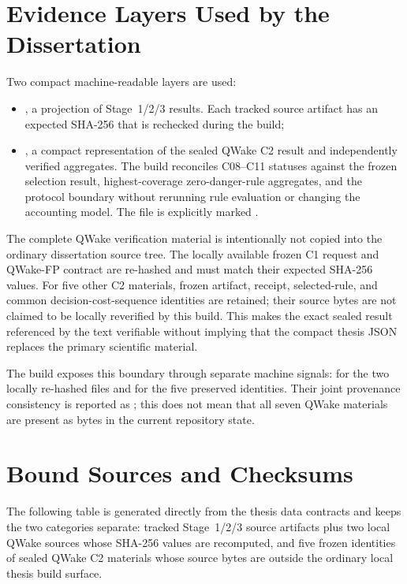 \section{Evidence Layers Used by the Dissertation}

Two compact machine-readable layers are used:
\begin{itemize}
  \item {}, a projection of Stage~1/2/3 results. Each tracked source artifact has an expected SHA-256 that is rechecked during the build;
  \item {}, a compact representation of the sealed QWake C2 result and independently verified aggregates. The build reconciles C08--C11 statuses against the frozen selection result, highest-coverage zero-danger-rule aggregates, and the protocol boundary without rerunning rule evaluation or changing the accounting model. The file is explicitly marked .
\end{itemize}

The complete QWake verification material is intentionally not copied into the ordinary
dissertation source tree. The locally available frozen C1 request and QWake-FP
contract are re-hashed and must match their expected SHA-256 values. For five other C2
materials, frozen artifact, receipt, selected-rule, and common decision-cost-sequence
identities are retained; their source bytes are not claimed to be locally reverified
by this build. This makes the exact sealed result referenced by the text verifiable
without implying that the compact thesis JSON replaces the primary scientific
material.

The build exposes this boundary through separate machine signals:
 for the two locally re-hashed
files and  for the five
preserved identities. Their joint provenance consistency is reported as
; this does not mean that all seven QWake
materials are present as bytes in the current repository state.

\section{Bound Sources and Checksums}

The following table is generated directly from the thesis data contracts and keeps
the two categories separate: tracked Stage~1/2/3 source artifacts plus two local
QWake sources whose SHA-256 values are recomputed, and five frozen identities of
sealed QWake C2 materials whose source bytes are outside the ordinary local thesis
build surface.

